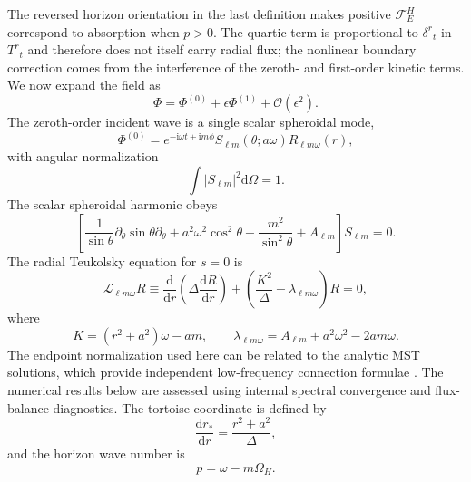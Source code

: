 \documentclass[aps,prd,twocolumn,10pt,nofootinbib,superscriptaddress,floatfix]{revtex4-2}
\newcommand{\dd}{\mathrm{d}}
\newcommand{\ii}{\mathrm{i}}
\newcommand{\calO}{\mathcal{O}}
\newcommand{\DeltaK}{\Delta}
\begin{document}
The reversed horizon orientation in the last definition makes positive
$\mathcal F_E^H$ correspond to absorption when $p>0$.  The quartic term is
proportional to $\delta^r{}_t$ in $T^r{}_t$ and therefore does not itself
carry radial flux; the nonlinear boundary correction comes from the
interference of the zeroth- and first-order kinetic terms.
We now expand the field as
\begin{equation}
\Phi=\Phi^{(0)}+\epsilon\Phi^{(1)}+\calO(\epsilon^2).
\end{equation}
The zeroth-order incident wave is a single scalar spheroidal mode,
\begin{equation}
\Phi^{(0)}=e^{-\ii\omega t+\ii m\phi}
S_{\ell m}(\theta;a\omega)R_{\ell m\omega}(r),
\end{equation}
with angular normalization
\begin{equation}
\int |S_{\ell m}|^2\dd\Omega=1.
\end{equation}
The scalar spheroidal harmonic obeys
\begin{equation}
\left[
\frac{1}{\sin\theta}\partial_\theta\sin\theta\partial_\theta
+a^2\omega^2\cos^2\theta
-\frac{m^2}{\sin^2\theta}+A_{\ell m}
\right]S_{\ell m}=0 .
\end{equation}
The radial Teukolsky equation for $s=0$ is~\cite{Teukolsky1973}
\begin{equation}
\mathcal L_{\ell m\omega}R
\equiv
\frac{\dd}{\dd r}\left(\DeltaK\frac{\dd R}{\dd r}\right)
+\left(\frac{K^2}{\DeltaK}-\lambda_{\ell m\omega}\right)R=0,
\label{eq:radial}
\end{equation}
where
\begin{equation}
K=(r^2+a^2)\omega-am,\qquad
\lambda_{\ell m\omega}=A_{\ell m}+a^2\omega^2-2am\omega .
\end{equation}
The endpoint normalization used here can be related to the analytic MST
solutions, which provide independent low-frequency connection formulae
\cite{MST1996}.  The numerical results below are assessed using internal
spectral convergence and flux-balance diagnostics.
The tortoise coordinate is defined by
\begin{equation}
\frac{\dd r_*}{\dd r}=\frac{r^2+a^2}{\DeltaK},
\end{equation}
and the horizon wave number is
\begin{equation}
p=\omega-m\Omega_H .
\end{equation}
\end{document}
